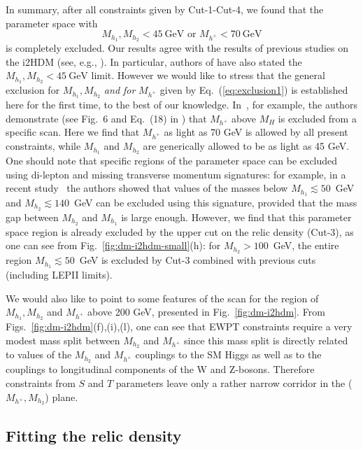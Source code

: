 In summary, after all constraints given by Cut-1-Cut-4,
we found that the parameter space with  
\begin{equation}
M_{h_1},M_{h_2}<45~\mbox{GeV} 
\mbox{\ or\ } M_{h^+}<70~\mbox{GeV} 
\label{eq:exclusion1}
\end{equation}
is completely excluded. Our results  agree with the results of previous studies on the i2HDM (see, e.g., \cite{Arhrib:2013ela,Ilnicka:2015jba}).
In particular, authors of \cite{Ilnicka:2015jba} have also stated 
the $M_{h_1},M_{h_2}<45~\mbox{GeV}$ limit.
However we would like to stress that the general exclusion 
for $M_{h_1},M_{h_2}$ {\it and for} $M_{h^+}$
given by Eq.~(\ref{eq:exclusion1}) is established here for the first time, to the best of our knowledge. In~\cite{Ilnicka:2015jba}, for example,  the authors demonstrate 
(see Fig.~6 and Eq.~(18) in \cite{Ilnicka:2015jba}) that 
$M_{h^+}$ above $M_H$ is excluded from a  specific scan. Here we find that
$M_{h^+}$ as light as 70 GeV  is allowed by all present constraints, while $M_{h_1}$ and
$M_{h_2}$ are generically allowed to be as light as 45 GeV. One should note that specific regions of the
parameter space can be excluded using di-lepton and missing transverse momentum
signatures: for example, in a recent study~\cite{Belanger:2015kga} the authors showed that values of the masses below
$M_{h_1}\lesssim 50$~GeV and  $M_{h_2}\lesssim 140$~GeV can be excluded using this signature,
provided that the mass gap between $M_{h_2}$ and $M_{h_1}$ is large enough. However, we find that this parameter
space region is already excluded by the upper cut on the relic density (Cut-3), as one can see
from Fig.~\ref{fig:dm-i2hdm-small}(h): for  $M_{h_2}>100$~GeV, the entire region $M_{h_1}\lesssim
50$~GeV  is excluded by Cut-3 combined with previous cuts (including LEPII limits).

We would also like to point to some features of the scan for  the region of $M_{h_1},M_{h_2}$ and
$M_{h^{+}}$ above 200 GeV, presented  in Fig.~\ref{fig:dm-i2hdm}. From 
Figs.~\ref{fig:dm-i2hdm}(f),(i),(l), one can see that EWPT constraints require a very  modest
mass split between $M_{h_2}$ and $M_{h^{+}}$ since this mass split is directly related to
values of the $M_{h_2}$ and $M_{h^{+}}$ couplings to  the SM Higgs as well as to the couplings
to longitudinal components of the W and Z-bosons. Therefore constraints from $S$ and $T$
parameters leave only a rather narrow corridor in the  ($M_{h^{+}},M_{h_2}$) plane.


\subsection{Fitting the relic density}



